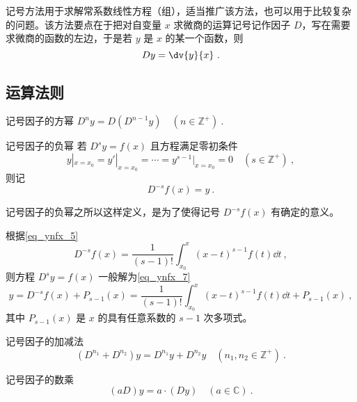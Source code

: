 
记号方法用于求解常系数线性方程（组），适当推广该方法，也可以用于比较复杂的问题。该方法要点在于把对自变量 $x$ 求微商的运算记号记作因子 $D$，写在需要求微商的函数的左边，于是若 $y$ 是 $x$ 的某一个函数，则
\begin{equation}\label{eq_Sign_10}
Dy=\dv{y}{x}~.
\end{equation}
\subsection{运算法则}
\begin{definition}{记号因子的方幂}\label{def_Sign_1}
$D^ny=D(D^{n-1}y)\quad(n\in\mathbb{Z^{+}})~.$
\end{definition}
\begin{definition}{记号因子的负幂}\label{def_Sign_2}
若 $D^sy=f(x)$ 且方程满足零初条件
\begin{equation}\label{eq_Sign_5}
y|_{x=x_0}=y'|_{x=x_0}=\cdots=y^{s-1}|_{x=x_0}=0\quad({s\in\mathbb{Z^{+}}})~,
\end{equation}
则记
\begin{equation}
D^{-s}f(x)=y~.
\end{equation}
\end{definition}
记号因子的负幂之所以这样定义，是为了使得记号 $D^{-s}f(x)$ 有确定的意义。

根据\autoref{eq_ynfx_5}~
\begin{equation}\label{eq_Sign_9}
D^{-s}f(x)=\frac{1}{(s-1)!}\int_{x_0}^x(x-t)^{s-1}f(t)\dd t~,
\end{equation}
则方程 $D^sy=f(x)$ 一般解为\autoref{eq_ynfx_7}~
\begin{equation}
y=D^{-s}f(x)+P_{s-1}(x)=\frac{1}{(s-1)!}\int_{x_0}^x(x-t)^{s-1}f(t)\dd t+P_{s-1}(x)~,
\end{equation}
其中 $P_{s-1}(x)$ 是 $x$ 的具有任意系数的 $s-1$ 次多项式。
\begin{definition}{记号因子的加减法}
\begin{equation}
(D^{n_1}+D^{n_2})y=D^{n_1}y+D^{n_2}y\quad(n_1,n_2\in \mathbb{Z^{+
}})~.
\end{equation}
\end{definition}
\begin{definition}{记号因子的数乘}
\begin{equation}
(aD)y=a\cdot(Dy)\quad(a\in\mathbb{C})~.
\end{equation}
\end{definition}

